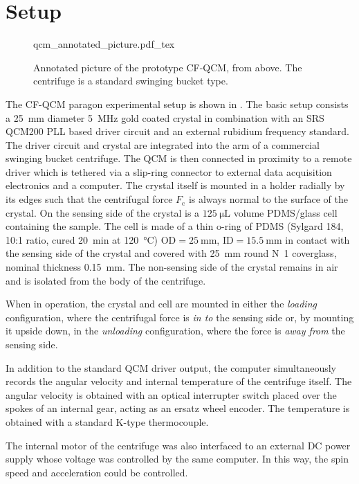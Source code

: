 \section{Setup}
\begin{figure}[ht]
\centering
{qcm_annotated_picture.pdf_tex}
\caption{Annotated picture of the prototype CF-QCM, from above.  The
centrifuge is a standard swinging bucket type.}
\label{fig:cfqcmexpsetup}
\end{figure}
The CF-QCM paragon experimental setup is shown in
.  The basic setup consists a
\SI{25}{\milli\meter} diameter \SI{5}{\mega\hertz} gold coated crystal in
combination with an SRS QCM200 PLL based driver circuit and an external
rubidium frequency standard.  The driver circuit and crystal are integrated
into the arm of a commercial swinging bucket centrifuge.  The QCM is then
connected in proximity to a remote driver which is tethered via a slip-ring
connector to external data acquisition electronics and a computer.  The crystal itself is
mounted in a holder radially by its edges such that the centrifugal force
$F_\mathrm{c}$ is always normal to the surface of the crystal.  On the
sensing side of the crystal is a $\SI{125}{\micro\liter}$ volume PDMS/glass
cell containing the sample.  The cell is made of a thin o-ring of PDMS
(Sylgard 184, 10:1 ratio, cured \SI{20}{\minute} at \SI{120}{\celsius})
$\text{OD}=\SI{25}{\milli\meter}$, $\text{ID}=\SI{15.5}{\milli\meter}$ in
contact with the sensing side of the crystal and covered with
\SI{25}{\milli\meter} round N~1
coverglass, nominal thickness \SI{0.15}{\milli\meter}.  The non-sensing
side of the crystal remains in air and is isolated from the body of the
centrifuge.  

When in operation, the crystal and cell are mounted in either the
\textit{loading} configuration, where the centrifugal force is \textit{in
to} the sensing side or, by mounting it upside down, in the
\textit{unloading} configuration, where the force is \textit{away from} the
sensing side.

In addition to the standard QCM driver output, the computer simultaneously
records the angular velocity and internal temperature of the centrifuge
itself.  The angular velocity is obtained with an optical interrupter
switch placed over the spokes of an internal gear, acting as an ersatz
wheel encoder.  The temperature is obtained with a standard K-type
thermocouple.

The internal motor of the centrifuge was also interfaced to an external DC
power supply whose voltage was controlled by the same computer.  In this
way, the spin speed and acceleration could be controlled.

